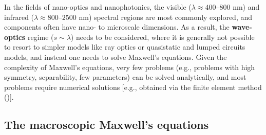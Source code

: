   In the fields of nano-optics and nanophotonics, the visible
  (\(\lambda \approx 400\)--\(800\) nm) and infrared (\(\lambda \approx 800\)--\(2500\)
  nm)
  spectral regions are most commonly explored, and components often have nano- to
  microscale dimensions. As a result, the \textbf{wave-optics} regime ($s
      \sim \lambda$) needs to be considered,
  where it is generally not possible to resort to simpler models like ray optics or
  quasistatic and lumped circuits models,
  and instead one needs to solve Maxwell's equations. Given the complexity of
  Maxwell's
  equations, very few problems (e.g., problems with high symmetry, separability,
  few parameters)
  can be solved analytically, and most problems require
  numerical solutions [e.g., obtained via the finite element method ()].

\subsection*{The macroscopic Maxwell's equations}

